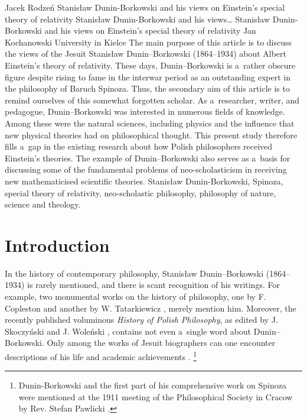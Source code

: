 \begin{artengenv}{Jacek Rodzeń}
	{Stanisław Dunin-Borkowski and his views on Einstein's special theory of relativity}
	{Stanisław Dunin-Borkowski and his views\ldots}
	{Stanisław Dunin-Borkowski and his views on Einstein's special theory of relativity}
	{Jan Kochanowski University in Kielce}
	{The main purpose of this article is to discuss the views of the Jesuit Stanisław Dunin–Borkowski (1864–1934) about Albert Einstein's theory of relativity. These days, Dunin–Borkowski is a~rather obscure figure despite rising to fame in the interwar period as an outstanding expert in the philosophy of Baruch Spinoza. Thus, the secondary aim of this article is to remind ourselves of this somewhat forgotten scholar. As a~researcher, writer, and pedagogue, Dunin–Borkowski was interested in numerous fields of knowledge. Among these were the natural sciences, including physics and the influence that new physical theories had on philosophical thought. This present study therefore fills a~gap in the existing research about how Polish philosophers received Einstein's theories. The example of Dunin–Borkowski also serves as a~basis for discussing some of the fundamental problems of neo-scholasticism in receiving new mathematicised scientific theories.}
	{Stanisław Dunin-Borkowski, Spinoza, special theory of relativity, neo-scholastic philosophy, philosophy of nature, science and theology.}





\section{Introduction}
\lettrine[loversize=0.13,lines=2,lraise=-0.01,nindent=0em,findent=0.2pt]%
{I}{}n the history of contemporary philosophy, Stanisław Dunin–Borkowski (1864–1934) is rarely mentioned, and there is scant recognition of his writings. For example, two monumental works on the history of philosophy, one by F. Copleston
\parencite*[][p.209]{copleston_history_1994} %
 and another by W. Tatarkiewicz 
\parencite[][p.365]{tatarkiewicz_historia_1998}, %
 merely mention him. Moreover, the recently published voluminous \textit{History of Polish Philosophy}, as edited by J. Skoczyński and J. Woleński 
\parencite*[][]{skoczynski_historia_2010}, %
 contains not even a~single word about Dunin–Borkowski. Only among the works of Jesuit biographers can one encounter descriptions of his life and academic achievements 
\parencites[cf.][]{siwek_stanislaw_1935}[][]{pummerer_p_1935}[][pp.103–104]{darowski_filozofia_2001}.%
\footnote{Dunin-Borkowski and the first part of his comprehensive work on Spinoza were mentioned at the 1911 meeting of the Philosophical Society in Cracow by Rev. Stefan Pawlicki 
\parencite*[][pp.13–14]{pawlicki_spinoza_1912}.%
}


\end{artengenv}
